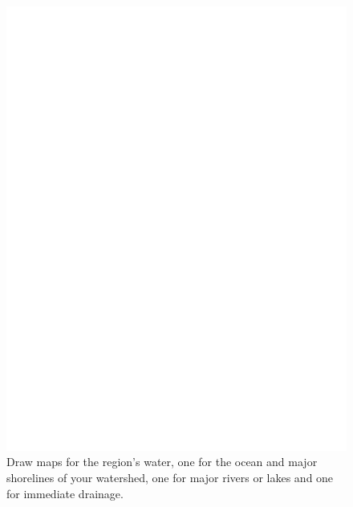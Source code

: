 \documentclass{report}
\begin{document}
 \begin{figure}
	\centering
	\includegraphics[width=5in]{imageserver/uploadimages/image3.png}
	\caption[watermaps]
	{Draw maps for the region's water, one for the ocean and major shorelines of your watershed, one for major rivers or lakes and one for immediate drainage.}
\end{figure}
\end{document}
